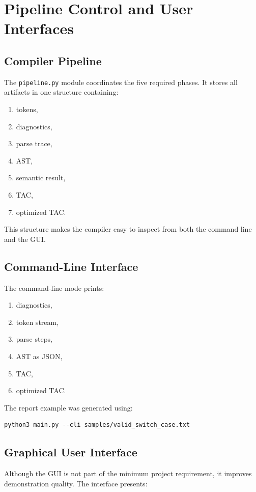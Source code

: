 \documentclass[12pt,a4paper]{article}
\begin{document}
\section{Pipeline Control and User Interfaces}
\subsection{Compiler Pipeline}
The \texttt{pipeline.py} module coordinates the five required phases. It stores all artifacts in one structure containing:

\begin{enumerate}
    \item tokens,
    \item diagnostics,
    \item parse trace,
    \item AST,
    \item semantic result,
    \item TAC,
    \item optimized TAC.
\end{enumerate}

This structure makes the compiler easy to inspect from both the command line and the GUI.

\subsection{Command-Line Interface}
The command-line mode prints:

\begin{enumerate}
    \item diagnostics,
    \item token stream,
    \item parse steps,
    \item AST as JSON,
    \item TAC,
    \item optimized TAC.
\end{enumerate}

The report example was generated using:

\begin{lstlisting}
python3 main.py --cli samples/valid_switch_case.txt
\end{lstlisting}

\subsection{Graphical User Interface}
Although the GUI is not part of the minimum project requirement, it improves demonstration quality. The interface presents:
\end{document}
